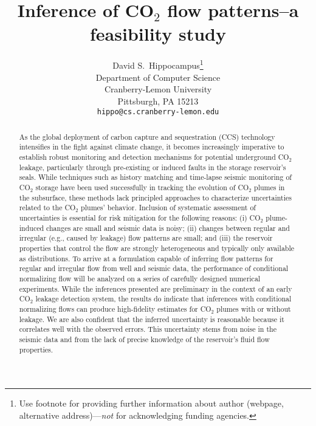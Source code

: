 \documentclass{article}
\title{Inference of CO$_2$ flow patterns--a feasibility study}
\author{%
  David S.~Hippocampus\thanks{Use footnote for providing further information
    about author (webpage, alternative address)---\emph{not} for acknowledging
    funding agencies.} \\
  Department of Computer Science\\
  Cranberry-Lemon University\\
  Pittsburgh, PA 15213 \\
  \texttt{hippo@cs.cranberry-lemon.edu} \\
}
\begin{document}
\maketitle

\begin{abstract}

As the global deployment of carbon capture and sequestration (CCS) technology intensifies in the fight against climate change, it becomes increasingly imperative to establish robust monitoring and detection mechanisms for potential underground CO${_2}$ leakage, particularly through pre-existing or induced faults in the storage reservoir's seals. While techniques such as history matching and time-lapse seismic monitoring of CO${_2}$ storage have been used successfully in tracking the evolution of CO${_2}$ plumes in the subsurface, these methods lack principled approaches to characterize uncertainties related to the CO$_2$ plumes' behavior. Inclusion of systematic assessment of uncertainties is essential for risk mitigation for the following reasons: (i) CO$_2$ plume-induced changes are small and seismic data is noisy; (ii) changes between regular and irregular (e.g., caused by leakage) flow patterns are small; and (iii) the reservoir properties that control the flow are strongly heterogeneous and typically only available as distributions. To arrive at a formulation capable of inferring flow patterns for regular and irregular flow from well and seismic data, the performance of conditional normalizing flow will be analyzed on a series of carefully designed numerical experiments. While the inferences presented are preliminary in the context of an early CO$_2$ leakage detection system, the results do indicate that inferences with conditional normalizing flows can produce high-fidelity estimates for CO$_2$ plumes with or without leakage. We are also confident that the inferred uncertainty is reasonable because it correlates well with the observed errors. This uncertainty stems from noise in the seismic data and from the lack of precise knowledge of the reservoir's fluid flow properties.
%
%
\end{abstract}
%
\end{document}
